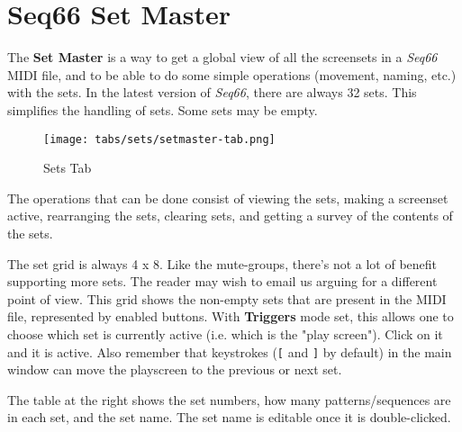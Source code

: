 %
%
%

\section{Seq66 Set Master}
\label{sec:setmaster}

   The \textbf{Set Master} is a way to get a global view of all the screensets
   in a \textsl{Seq66} MIDI file, and to be able to do some simple operations
   (movement, naming, etc.) with the sets.
   In the latest version of \textsl{Seq66}, there are always 32 sets.
   This simplifies the handling of sets.
   Some sets may be empty.

\begin{figure}[H]
   \centering 
   \texttt{[image: tabs/sets/setmaster-tab.png]}
   \caption{Sets Tab}
   \label{fig:setmaster_tab}
\end{figure}

   The operations that can be done consist of viewing the sets, making a
   screenset active, rearranging the sets, clearing sets, and getting a survey
   of the contents of the sets.

   \setcounter{ItemCounter}{0}      %

   The set grid is always 4 x 8.  Like the mute-groups, there's not
   a lot of benefit supporting more sets.  The reader may wish to email us
   arguing for a different point of view.
   This grid shows the non-empty sets that are present in the MIDI file,
   represented by enabled buttons.
   With \textbf{Triggers} mode set, this  allows one to choose which set
   is currently
   active (i.e. which is the "play screen").
   Click on it and it is active.
   Also remember that keystrokes (\texttt{[} and \texttt{]} by default)
   in the main window can move the playscreen to the previous or next set.
 
   The table at the right shows the set numbers, how many patterns/sequences
   are in each set, and the set name.  The set name is editable once it is
   double-clicked.

